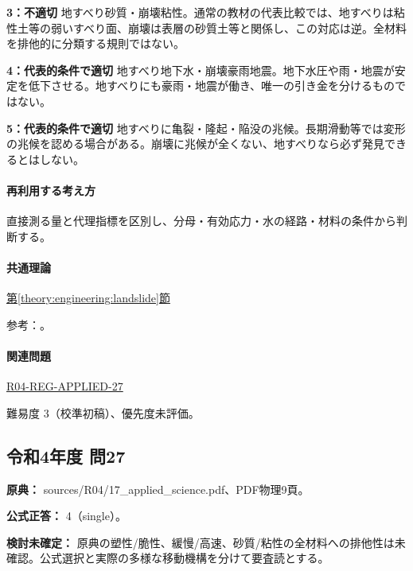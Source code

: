 \noindent\textbf{3：不適切} 地すべり砂質・崩壊粘性。通常の教材の代表比較では、地すべりは粘性土等の弱いすべり面、崩壊は表層の砂質土等と関係し、この対応は逆。全材料を排他的に分類する規則ではない。\par

\noindent\textbf{4：代表的条件で適切} 地すべり地下水・崩壊豪雨地震。地下水圧や雨・地震が安定を低下させる。地すべりにも豪雨・地震が働き、唯一の引き金を分けるものではない。\par

\noindent\textbf{5：代表的条件で適切} 地すべりに亀裂・隆起・陥没の兆候。長期滑動等では変形の兆候を認める場合がある。崩壊に兆候が全くない、地すべりなら必ず発見できるとはしない。\par

\paragraph{再利用する考え方} 直接測る量と代理指標を区別し、分母・有効応力・水の経路・材料の条件から判断する。

\paragraph{共通理論} \hyperref[theory:engineering:landslide]{第\ref*{theory:engineering:landslide}節}

\par 参考：\cite{eng52_landslide_ref}。

\paragraph{関連問題} \hyperref[q:r04-reg-applied-27]{R04-REG-APPLIED-27}

\par 難易度 3（校準初稿）、優先度未評価。

\subsection{令和4年度 問27}
\label{q:r04-reg-applied-27}

\noindent\textbf{原典：} sources/R04/17\_applied\_science.pdf、PDF物理9頁。

\textbf{公式正答：} 4（single）。

\par\textbf{検討未確定：} 原典の塑性/脆性、緩慢/高速、砂質/粘性の全材料への排他性は未確認。公式選択と実際の多様な移動機構を分けて要査読とする。

